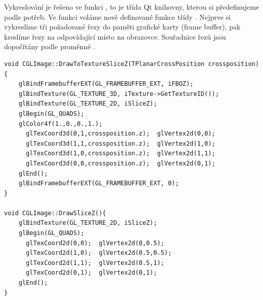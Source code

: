 Vykreslování je řešeno ve funkci , to je třída Qt knihovny, kterou si předefinujeme podle potřeb. Ve funkci voláme nově definované funkce třídy . Nejprve si vykreslíme tři požadované řezy do paměti grafické karty (frame buffer), pak kreslíme řezy na odpovídající místo na obrazovce. Souřadnice řezů jsou dopočítány podle proměnné .

\begin{lstlisting}[label=DicomImageClass,caption={První část souboru \texttt{Window.cpp} se zdrojovým kódem třídy reprezentující okno programu.}]
void CGLImage::DrawToTextureSliceZ(TPlanarCrossPosition crossposition){
	glBindFramebufferEXT(GL_FRAMEBUFFER_EXT, iFBOZ);
	glBindTexture(GL_TEXTURE_3D, iTexture->GetTextureID());
	glBindTexture(GL_TEXTURE_2D, iSliceZ);
	glBegin(GL_QUADS);
	glColor4f(1.,0.,0.,1.);
	  glTexCoord3d(0,1,crossposition.z);  glVertex2d(0,0);
	  glTexCoord3d(1,1,crossposition.z);  glVertex2d(1,0);
	  glTexCoord3d(1,0,crossposition.z);  glVertex2d(1,1);
	  glTexCoord3d(0,0,crossposition.z);  glVertex2d(0,1);
	glEnd();
	glBindFramebufferEXT(GL_FRAMEBUFFER_EXT, 0);
}

void CGLImage::DrawSliceZ(){
	glBindTexture(GL_TEXTURE_2D, iSliceZ);
	glBegin(GL_QUADS);
	  glTexCoord2d(0,0);  glVertex2d(0,0.5);
	  glTexCoord2d(1,0);  glVertex2d(0.5,0.5);
	  glTexCoord2d(1,1);  glVertex2d(0.5,1);
	  glTexCoord2d(0,1);  glVertex2d(0,1);
	glEnd();
}
\end{lstlisting}





